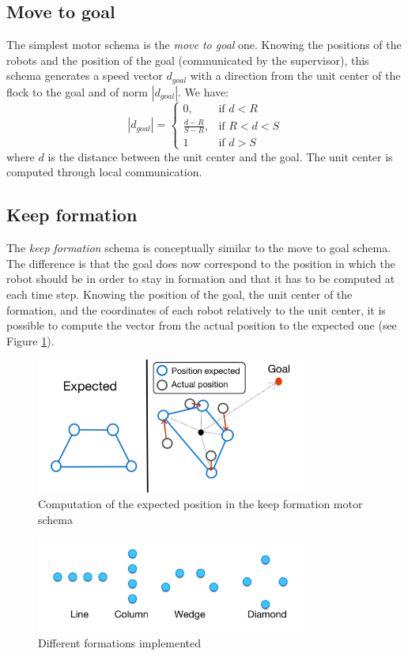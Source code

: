 \documentclass[journal]{IEEEtran}
\begin{document}
\subsection{Move to goal}  
The simplest motor schema is the \textit{move to goal} one. Knowing the positions of the robots and the position of the goal (communicated by the supervisor), this schema generates a speed vector $d_{goal}$ with a direction from the unit center of the flock to the goal and of norm $|d_{goal}|$. We have:
\begin{equation}
|d_{goal}| = \begin{cases} 0, & \mbox{if }  d<R \\ \frac{d-R}{S-R}, & \mbox{if }
   R<d<S \\ 1 & \mbox{if } d>S\end{cases}
\end{equation}
where $d$ is the distance between the unit center and the goal. The unit center is computed through local communication.

\subsection{Keep formation}
The \textit{keep formation} schema is conceptually similar to the move to goal schema. The difference is that the goal does now correspond to the position in which the robot should be in order to stay in formation and that it has to be computed at each time step. Knowing the position of the goal, the unit center of the formation, and the coordinates of each robot relatively to the unit center, it is possible to compute the vector from the actual position to the expected one (see Figure \ref{img:keep_formation}). 
\begin{figure}[!t]
\centering
\includegraphics[width=3.5in]{Images/keep_formation.jpg}
\caption{Computation of the expected position in the keep formation motor schema}
\label{img:keep_formation}
\end{figure}
\begin{figure}[!t]
\centering
\includegraphics[width=3.5in]{Images/formation.jpg}
\caption{Different formations implemented}
\label{img:formation}
\end{figure}
\end{document}

